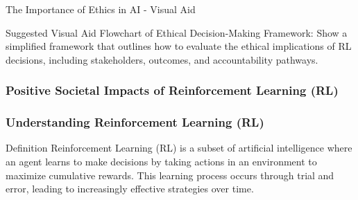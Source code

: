 \documentclass[aspectratio=169]{beamer}
\begin{document}
\begin{frame}[fragile]{The Importance of Ethics in AI - Visual Aid}
    \begin{block}{Suggested Visual Aid}
        Flowchart of Ethical Decision-Making Framework: Show a simplified framework that outlines how to evaluate the ethical implications of RL decisions, including stakeholders, outcomes, and accountability pathways.
    \end{block}
\end{frame}

\begin{frame}[fragile]
    \frametitle{Positive Societal Impacts of Reinforcement Learning (RL)}
\end{frame}

\begin{frame}[fragile]
    \frametitle{Understanding Reinforcement Learning (RL)}
    \begin{block}{Definition}
        Reinforcement Learning (RL) is a subset of artificial intelligence where an agent learns to make decisions by taking actions in an environment to maximize cumulative rewards. This learning process occurs through trial and error, leading to increasingly effective strategies over time.
    \end{block}
\end{frame}
\end{document}
